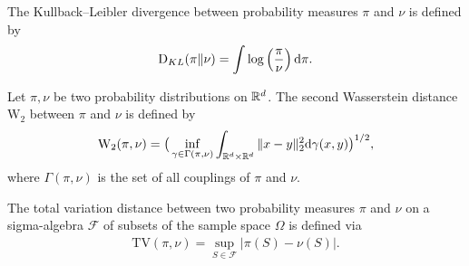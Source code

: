 \begin{definition}
The Kullback–Leibler divergence between probability measures $\pi$ and $\nu$ is defined by 
\begin{align*}
    \mathrm{D}_{KL}(\pi\|\nu)=\int  \log\left(\frac{\pi}{\nu}\right)\mathrm{d} \pi.
\end{align*}
\end{definition}

\begin{definition}
Let $\pi,\nu$ be two probability distributions on $\mathbb{R}^d$.
The second Wasserstein distance $\mathrm{W}_{2}$ between $\pi$ and $\nu$ is defined by
\begin{align*}
    \mathrm{W}_2(\pi,\nu)=\big( \inf_{\gamma\in\Gamma(\pi,\nu)}\int_{\mathbb{R}^d\times\mathbb{R}^d}\|x-y\|_2^2\mathrm{d} \gamma(x,y) \big)^{1/2},
\end{align*}
where $\Gamma(\pi,\nu)$ is the set of all couplings of $\pi$ and $\nu$.
\end{definition}

\begin{definition}
The total variation distance between two probability measures $\pi$ and $\nu$ on a sigma-algebra $\mathcal{F}$ of subsets of the sample space $\Omega$ is defined via
\begin{align*}
    \mathrm{TV}(\pi,\nu)=\sup_{S\in \mathcal{F}}|\pi(S)-\nu(S)|.
\end{align*}
\end{definition}


